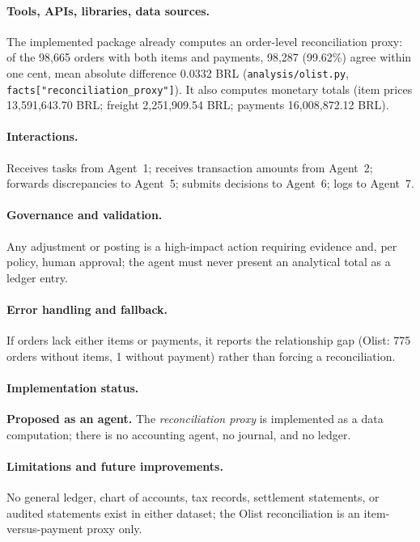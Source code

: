 \documentclass[11pt,a4paper]{article}
\newcommand{\code}[1]{\texttt{#1}}
\begin{document}
\paragraph{Tools, APIs, libraries, data sources.} The implemented package already computes an order-level reconciliation proxy: of the 98{,}665 orders with both items and payments, 98{,}287 (99.62\%) agree within one cent, mean absolute difference 0.0332 BRL (\code{analysis/olist.py}, \code{facts["reconciliation\_proxy"]}). It also computes monetary totals (item prices 13{,}591{,}643.70 BRL; freight 2{,}251{,}909.54 BRL; payments 16{,}008{,}872.12 BRL).

\paragraph{Interactions.} Receives tasks from Agent~1; receives transaction amounts from Agent~2; forwards discrepancies to Agent~5; submits decisions to Agent~6; logs to Agent~7.

\paragraph{Governance and validation.} Any adjustment or posting is a high-impact action requiring evidence and, per policy, human approval; the agent must never present an analytical total as a ledger entry.

\paragraph{Error handling and fallback.} If orders lack either items or payments, it reports the relationship gap (Olist: 775 orders without items, 1 without payment) rather than forcing a reconciliation.

\paragraph{Implementation status.} \textbf{Proposed as an agent.} The \emph{reconciliation proxy} is implemented as a data computation; there is no accounting agent, no journal, and no ledger.

\paragraph{Limitations and future improvements.} No general ledger, chart of accounts, tax records, settlement statements, or audited statements exist in either dataset; the Olist reconciliation is an item-versus-payment proxy only.
\end{document}
